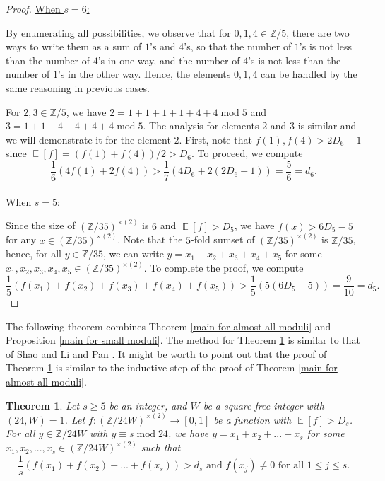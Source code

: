 \documentclass[11pt]{amsart}
\theoremstyle{plain} %
\newtheorem{thm}{Theorem}[section]
\theoremstyle{remark}
\numberwithin{equation}{section}
\newcommand{\E}{\mathop{\mathbb{E}}}
\newcommand{\Z}{\mathbb{Z}}
\begin{document}
\begin{proof}
    \noindent\underline{When $s=6$:}

    By enumerating all possibilities, we observe that for $0,1,4\in \Z/5$, there are two ways to write them as a sum of $1$'s and $4$'s, so that the number of $1$'s is not less than the number of $4$'s in one way, and the number of $4$'s is not less than the number of $1$'s in the other way. Hence, the elements $0,1,4$ can be handled by the same reasoning in previous cases.

    For $2,3\in \Z/5$, we have $2=1+1+1+1+4+4\;\mathrm{mod}\;5$ and $3=1+1+4+4+4+4\;\mathrm{mod}\;5$. The analysis for elements $2$ and $3$ is similar and we will demonstrate it for the element $2$. First, note that $f(1),f(4)>2D_6-1$ since $\E[f]=(f(1)+f(4))/2>D_6$. To proceed, we compute
    \begin{equation*}
            \frac{1}{6}(4f(1)+2f(4))>\frac{1}{7}(4D_6+2(2D_6-1))=\frac{5}{6}=d_6.
    \end{equation*}\\

    \noindent\underline{When $s=5$:}

    Since the size of $(\Z/35)^{\times(2)}$ is $6$ and $\E[f]>D_5$, we have $f(x)>6D_5-5$ for any $x\in (\Z/35)^{\times(2)}$. Note that the $5$-fold sumset of $(\Z/35)^{\times(2)}$ is $\Z/35$, hence, for all $y\in \Z/35$, we can write $y=x_1+x_2+x_3+x_4+x_5$ for some $x_1,x_2,x_3,x_4,x_5\in (\Z/35)^{\times(2)}$. To complete the proof, we compute
    \begin{equation*}
        \frac{1}{5}(f(x_1)+f(x_2)+f(x_3)+f(x_4)+f(x_5))>\frac{1}{5}(5(6D_5-5))=\frac{9}{10}=d_5.
    \end{equation*}
\end{proof}

The following theorem combines Theorem \ref{main for almost all moduli} and Proposition \ref{main for small moduli}. The method for Theorem \ref{main for all moduli} is similar to that of Shao \cite[Proposition 3.1]{Shao} and Li and Pan \cite[Theorem 1.2]{LiPan}. It might be worth to point out that the proof of Theorem \ref{main for all moduli} is similar to the inductive step of the proof of Theorem \ref{main for almost all moduli}.

\begin{thm}\label{main for all moduli}
    Let $s\geq 5$ be an integer, and $W$ be a square free integer with $(24,W)=1$. Let $f:(\Z/24W)^{\times(2)}\longrightarrow[0,1]$ be a function with $\E[f]>D_s$. For all $y\in \Z/24W$ with $y\equiv s\; \mathrm{mod}\;24$, we have $y=x_1+x_2+...+x_s$ for some $x_1,x_2,...,x_s\in (\Z/24W)^{\times(2)}$ such that
    \begin{equation*}
        \text{$\frac{1}{s}(f(x_1)+f(x_2)+...+f(x_s))>d_s$ and $f(x_j)\neq 0$ for all $1\leq j \leq s$.}
    \end{equation*}
\end{thm}
\end{document}
